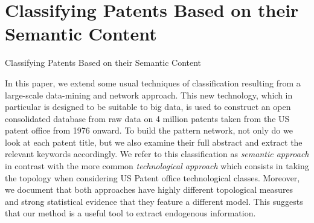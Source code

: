 


\section{Classifying Patents Based on their Semantic Content}{Classifying Patents Based on their Semantic Content}

\label{app:sec:patentsmining}





In this paper, we extend some usual techniques of classification resulting from a large-scale data-mining and network approach. This new technology, which in particular is designed to be suitable to big data, is used to construct an open consolidated database from raw data on 4 million patents taken from the US patent office from 1976 onward. To build the pattern network, not only do we look at each patent title, but we also examine their full abstract and extract the relevant keywords accordingly. We refer to this classification as \emph{semantic approach} in contrast with the more common \emph{technological approach} which consists in taking the topology when considering US Patent office technological classes. Moreover, we document that both approaches have highly different topological measures and strong statistical evidence that they feature a different model. This suggests that our method is a useful tool to extract endogenous information.    





